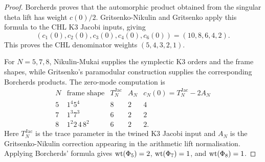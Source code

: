 \begin{proof}
Borcherds proves that the automorphic product obtained from the
singular theta lift has weight \(c(0)/2\).  Gritsenko-Nikulin and
Gritsenko apply this formula to the CHL K3 Jacobi inputs, giving
\[
  (c_1(0),c_2(0),c_3(0),c_4(0),c_6(0))=(10,8,6,4,2).
\]
This proves the CHL denominator weights \((5,4,3,2,1)\).

For \(N=5,7,8\), Nikulin-Mukai supplies the symplectic K3 orders and
the frame shapes, while Gritsenko's paramodular construction supplies
the corresponding Borcherds products.  The zero-mode computation is
\[
\begin{array}{c|c|c|c|c}
N&\text{frame shape}&T^{\mathrm{Jac}}_N&A_N&c_N(0)=T^{\mathrm{Jac}}_N-2A_N\\
\hline
5&1^4 5^4&8&2&4\\
7&1^3 7^3&6&2&2\\
8&1^2 2\,4\,8^2&6&2&2 .
\end{array}
\]
Here \(T^{\mathrm{Jac}}_N\) is the trace parameter in the twined K3
Jacobi input and \(A_N\) is the Gritsenko-Nikulin correction appearing
in the arithmetic lift normalisation.  Applying Borcherds' formula gives
\(\operatorname{wt}(\Phi_5)=2\), \(\operatorname{wt}(\Phi_7)=1\), and \(\operatorname{wt}(\Phi_8)=1\).
\end{proof}

